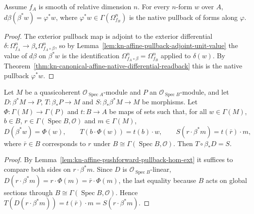 \begin{lemma}
\label{lem:kn-affine-algebra-canonical-differential-unit}
\leanok
Assume $f_A$ is smooth of relative dimension $n$. For every $n$-form $w$ over $A$,
$d\beta(\beta^*w)=\varphi^*w$, where $\varphi^*w\in\Gamma(\Omega^n_{f_B})$ is the native
pullback of forms along $\varphi$.
\end{lemma}
\begin{proof}
The exterior pullback map is adjoint to the exterior differential
$\delta:\Omega^n_{f_A}\to\beta_*\Omega^n_{f_A\circ\beta}$, so by
Lemma~\ref{lem:kn-affine-pullback-adjoint-unit-value} the value of $d\beta$ on $\beta^*w$ is
the identification $\Omega^n_{f_A\circ\beta}=\Omega^n_{f_B}$ applied to $\delta(w)$. By
Theorem~\ref{thm:kn-canonical-affine-native-differential-readback} this is the native
pullback $\varphi^*w$.
\end{proof}

\begin{lemma}
\label{lem:kn-affine-line-normalization-abstract}
\leanok
Let $M$ be a quasicoherent $\mathcal O_{\operatorname{Spec}A}$-module and $P$ an
$\mathcal O_{\operatorname{Spec}B}$-module, and let $D:\beta^*M\to P$,
$T:\beta_*P\to M$ and $S:\beta_*\beta^*M\to M$ be morphisms. Let
$\Phi:\Gamma(M)\to\Gamma(P)$ and $t:B\to A$ be maps of sets such that, for all
$w\in\Gamma(M)$, $b\in B$, $r\in\Gamma(\operatorname{Spec}B,\mathcal O)$ and $m\in\Gamma(M)$,
\[
 D(\beta^*w)=\Phi(w),\qquad T(b\cdot\Phi(w))=t(b)\cdot w,\qquad
 S(r\cdot\beta^*m)=t(\bar r)\cdot m,
\]
where $\bar r\in B$ corresponds to $r$ under $B\cong\Gamma(\operatorname{Spec}B,\mathcal O)$.
Then $T\circ\beta_*D=S$.
\end{lemma}
\begin{proof}
By Lemma~\ref{lem:kn-affine-pushforward-pullback-hom-ext} it suffices to compare both sides on
$r\cdot\beta^*m$. Since $D$ is $\mathcal O_{\operatorname{Spec}B}$-linear,
$D(r\cdot\beta^*m)=r\cdot\Phi(m)=\bar r\cdot\Phi(m)$, the last equality because $B$ acts on
global sections through $B\cong\Gamma(\operatorname{Spec}B,\mathcal O)$. Hence
$T(D(r\cdot\beta^*m))=t(\bar r)\cdot m=S(r\cdot\beta^*m)$.
\end{proof}

